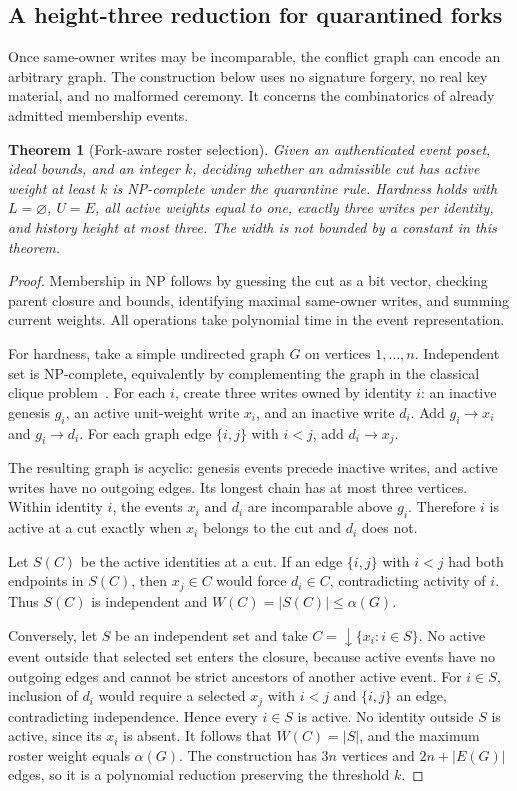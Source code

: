 \documentclass[11pt]{article}
\newtheorem{theorem}{Theorem}[section]
\theoremstyle{definition}
\begin{document}
\subsection{A height-three reduction for quarantined forks}
Once same-owner writes may be incomparable, the conflict graph can encode an arbitrary graph. The construction below uses no signature forgery, no real key material, and no malformed ceremony. It concerns the combinatorics of already admitted membership events.

\begin{theorem}[Fork-aware roster selection]\label{thm:hardness}
Given an authenticated event poset, ideal bounds, and an integer $k$, deciding whether an admissible cut has active weight at least $k$ is NP-complete under the quarantine rule. Hardness holds with $L=\varnothing$, $U=E$, all active weights equal to one, exactly three writes per identity, and history height at most three. The width is not bounded by a constant in this theorem.
\end{theorem}
\begin{proof}
Membership in NP follows by guessing the cut as a bit vector, checking parent closure and bounds, identifying maximal same-owner writes, and summing current weights. All operations take polynomial time in the event representation.

For hardness, take a simple undirected graph $G$ on vertices $1,\ldots,n$. Independent set is NP-complete, equivalently by complementing the graph in the classical clique problem~\cite{karp1972reducibility}. For each $i$, create three writes owned by identity $i$: an inactive genesis $g_i$, an active unit-weight write $x_i$, and an inactive write $d_i$. Add $g_i\to x_i$ and $g_i\to d_i$. For each graph edge $\{i,j\}$ with $i<j$, add $d_i\to x_j$.

The resulting graph is acyclic: genesis events precede inactive writes, and active writes have no outgoing edges. Its longest chain has at most three vertices. Within identity $i$, the events $x_i$ and $d_i$ are incomparable above $g_i$. Therefore $i$ is active at a cut exactly when $x_i$ belongs to the cut and $d_i$ does not.

Let $S(C)$ be the active identities at a cut. If an edge $\{i,j\}$ with $i<j$ had both endpoints in $S(C)$, then $x_j\in C$ would force $d_i\in C$, contradicting activity of $i$. Thus $S(C)$ is independent and $W(C)=|S(C)|\leq\alpha(G)$.

Conversely, let $S$ be an independent set and take $C=\downarrow\{x_i:i\in S\}$. No active event outside that selected set enters the closure, because active events have no outgoing edges and cannot be strict ancestors of another active event. For $i\in S$, inclusion of $d_i$ would require a selected $x_j$ with $i<j$ and $\{i,j\}$ an edge, contradicting independence. Hence every $i\in S$ is active. No identity outside $S$ is active, since its $x_i$ is absent. It follows that $W(C)=|S|$, and the maximum roster weight equals $\alpha(G)$. The construction has $3n$ vertices and $2n+|E(G)|$ edges, so it is a polynomial reduction preserving the threshold $k$.
\end{proof}
\end{document}
